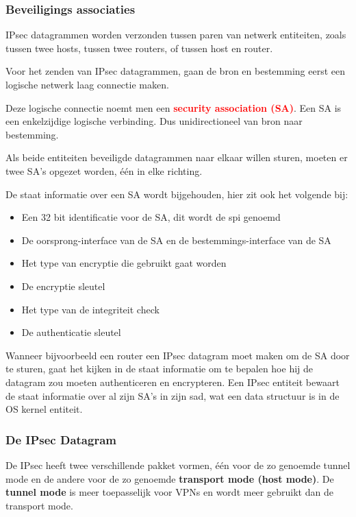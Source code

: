 \subsubsection{Beveiligings associaties}

\noindent IPsec datagrammen worden verzonden tussen paren van netwerk entiteiten, zoals tussen twee hosts, tussen twee routers, of tussen host en router.

\noindent Voor het zenden van IPsec datagrammen, gaan de bron en bestemming eerst een logische netwerk laag connectie maken.

\noindent Deze logische connectie noemt men een \textcolor{red}{\textbf{security association (SA)}}. Een SA is een enkelzijdige logische verbinding. Dus unidirectioneel van bron naar bestemming.

\noindent Als beide entiteiten beveiligde datagrammen naar elkaar willen sturen, moeten er twee SA’s opgezet worden, één in elke richting.

\noindent De staat informatie over een SA wordt bijgehouden, hier zit ook het volgende bij:
\begin{itemize}
\item Een 32 bit identificatie voor de SA, dit wordt de \acrfull{spi} genoemd
\item De oorsprong-interface van de SA en de bestemmings-interface van de SA
\item Het type van encryptie die gebruikt gaat worden
\item De encryptie sleutel
\item Het type van de integriteit check
\item De authenticatie sleutel
\end{itemize}

\noindent Wanneer bijvoorbeeld een router een IPsec datagram moet maken om de SA door te sturen, gaat het kijken in de staat informatie om te bepalen hoe hij de datagram zou moeten authenticeren en encrypteren.
Een IPsec entiteit bewaart de staat informatie over al zijn SA’s in zijn \acrfull{sad}, wat een data structuur is in de OS kernel entiteit.

\newpage

\subsubsection{De IPsec Datagram}

\noindent De IPsec heeft twee verschillende pakket vormen, één voor de zo genoemde tunnel mode en de andere voor de zo genoemde \textbf{transport mode (host mode)}. De \textbf{tunnel mode} is meer toepasselijk voor VPNs en wordt meer gebruikt dan de transport mode.

